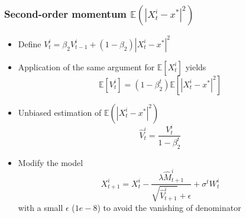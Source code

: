 \documentclass[aspectratio=169]{beamer}
\begin{document}
\begin{frame}
	\frametitle{Second-order momentum $\mathbb{E}(|X^i_t-x^*|^2)$}
	
	\begin{itemize}
		\item Define $V^i_t  = \beta_2 V^i_{t-1} + (1-\beta_2) |X^i_t - x^*|^2$
		\item[] Application of the same argument for $\mathbb{E}[X^i_t]$ yields
		\begin{equation*}
		\mathbb{E}[V^i_t] = (1-\beta_2^t) \mathbb{E}[|X^i_t-x^*|^2]
		\end{equation*}
		\item[] Unbiased estimation of $\mathbb{E}(|X^i_t-x^*|^2)$
		\[\hat{V}^i_t = \frac{V^i_t}{1-\beta_2^t}\]
		\item Modify the model
		\begin{equation*}
			X^i_{t+1} = X_t^i - \frac{\lambda \hat{M}^i_{t+1}}{\sqrt{\hat{V}^i_{t+1}} + \epsilon} + \sigma^ t  W_t^i
		\end{equation*}
		with a small $\epsilon$ ($1e-8$) to avoid the vanishing of denominator
	\end{itemize}

\end{frame}
\end{document}
